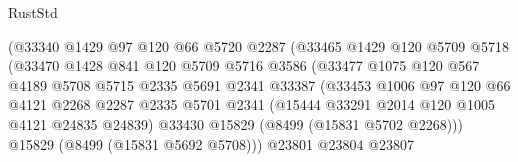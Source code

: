 \begin{lexlean}{RustStd}
\begin{coremodule}
                                      (@33340
                                        @1429
                                        @97
                                        @120
                                        @66
                                        @5720
                                        @2287
                                        (@33465
                                          @1429
                                          @120
                                          @5709
                                          @5718
                                          (@33470
                                            @1428
                                            @841
                                            @120
                                            @5709
                                            @5716
                                            @3586
                                            (@33477
                                              @1075
                                              @120
                                              @567
                                              @4189
                                              @5708
                                              @5715
                                              @2335
                                              @5691
                                              @2341
                                              @33387
                                              (@33453
                                                @1006
                                                @97
                                                @120
                                                @66
                                                @4121
                                                @2268
                                                @2287
                                                @2335
                                                @5701
                                                @2341
                                                (@15444 @33291 @2014 @120 @1005 @4121 @24835 @24839)
                                                @33430
                                                @15829
                                                (@8499 (@15831 @5702 @2268)))
                                              @15829
                                              (@8499 (@15831 @5692 @5708)))
                                            @23801
                                            @23804
                                            @23807

\end{coremodule}
\end{lexlean}
